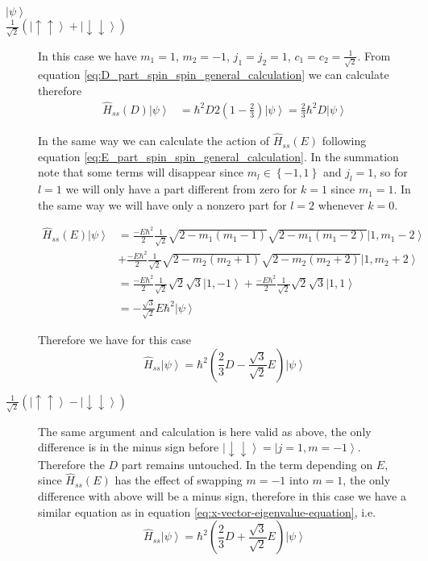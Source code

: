 \documentclass[A4paper, 12pt]{article}
\newcommand{\uu}{\left | \uparrow\uparrow \right \rangle}
\newcommand{\dd}{\left | \downarrow\downarrow \right \rangle}
\newcommand{\x}{\frac{1}{\sqrt 2}\left( \uu + \dd\right)}
\newcommand{\y}{\frac{1}{\sqrt 2}\left( \uu - \dd\right)}
\begin{document}
\begin{description}
  \item[$ \left | \psi  \right \rangle $]
  \item[$\x$] In this case we have $ m_{1} = 1 $, $ m_{2} = -1 $, $ j_{1}=j_{2}=1 $, $ c_{1} = c_{2} = \frac{1}{ \sqrt{2 } } $.
    From equation \ref{eq:D_part_spin_spin_general_calculation} we can calculate therefore
    \begin{align*}
    \hat{H}_{ss}(D) \left | \psi  \right \rangle &=
      \hbar^{2}D
      2\left(1- \frac{2}{3}\right)
    \left | \psi  \right \rangle =
    \frac{2}{3}
    \hbar^{2}D
  \left | \psi  \right \rangle
\end{align*}

In the same way we can calculate the action of $ \hat{H}_{ss}(E) $ following
equation \ref{eq:E_part_spin_spin_general_calculation}.  In the summation note
that some terms will disappear since $ m_{l} \in \left \{ -1,1 \right \}  $ and
$ j_{l} = 1 $, so for $ l=1 $ we will only have a part different from zero for
$ k=1 $ since $ m_{1} = 1 $. In the same way we will have only a nonzero part
for $ l=2 $ whenever $ k = 0 $.

\begin{align*}
\hat{H}_{ss}(E) \left | \psi  \right \rangle
&=
\frac{-E\hbar^{2}}{2}
\frac{1}{ \sqrt{2 } }
\sqrt{2- m_{1}(m_{1}-1) }
\sqrt{2- m_{1}(m_{1}-2) }
  \left | 1,m_{1}-2 \right \rangle \\
  &+
  \frac{-E\hbar^{2}}{2}
  \frac{1}{ \sqrt{2 } }
  \sqrt{2- m_{2}(m_{2}+ 1) }
  \sqrt{2- m_{2}(m_{2}+ 2) }
\left | 1,m_{2}+2 \right \rangle \\
&=
\frac{-E\hbar^{2}}{2}
\frac{1}{ \sqrt{2 } }
\sqrt{2}
\sqrt{3}
  \left | 1,-1\right \rangle
  +
  \frac{-E\hbar^{2}}{2}
  \frac{1}{ \sqrt{2 } }
  \sqrt{2}
  \sqrt{3}
\left | 1,1\right \rangle \\
&=
-\frac{ \sqrt{3 } }{ \sqrt{2 } }E\hbar^{2}
  \left | \psi  \right \rangle
\end{align*}

Therefore we have for this case
\begin{equation}
  \label{eq:x-vector-eigenvalue-equation}
  \hat{H}_{ss}
\left | \psi  \right \rangle
=
\hbar^{2}
\left(
  \frac{2}{3} D
  -
  \frac{\sqrt{3}}{\sqrt{2}}E
\right)
\left | \psi  \right \rangle
\end{equation}

  \item[$\y$] The same argument and calculation is here valid as above, the
    only difference is in the minus sign before $ \dd = \left | j=1,m=-1 \right
  \rangle  $. Therefore the $ D $ part remains untouched. In the term depending
  on $ E $, since $ \hat{H}_{ss}(E) $ has the effect of swapping $ m=-1 $ into
  $ m=1 $, the only difference with above will be a minus sign, therefore in
  this case we have a similar equation as in equation
  \ref{eq:x-vector-eigenvalue-equation}, i.e.
  \begin{equation}
    \label{eq:y-vector-eigenvalue-equation}
    \hat{H}_{ss}
  \left | \psi  \right \rangle
  =
  \hbar^{2}
  \left(
    \frac{2}{3} D
    +
    \frac{\sqrt{3}}{\sqrt{2}}E
  \right)
\left | \psi  \right \rangle
  \end{equation}


\end{description}
\end{document}
